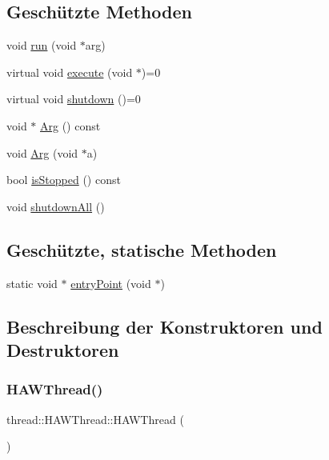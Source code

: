 \subsection*{Geschützte Methoden}
\begin{DoxyCompactItemize}
\item 
void \hyperlink{classthread_1_1_h_a_w_thread_a9a3e17be59877d350e310eb19c52679b}{run} (void $\ast$arg)
\item 
virtual void \hyperlink{classthread_1_1_h_a_w_thread_ae565cb73c096b246664bd2474b9c8907}{execute} (void $\ast$)=0
\item 
virtual void \hyperlink{classthread_1_1_h_a_w_thread_a843ee9493a41cec7e932fdec67a3b244}{shutdown} ()=0
\item 
void $\ast$ \hyperlink{classthread_1_1_h_a_w_thread_a87d9850bda803fafa714c32a63c11a89}{Arg} () const
\item 
void \hyperlink{classthread_1_1_h_a_w_thread_a368c07a801fb8f5e7bb181d2453df4be}{Arg} (void $\ast$a)
\item 
bool \hyperlink{classthread_1_1_h_a_w_thread_acd3923a840cbe1fea040fc149c4ab749}{is\+Stopped} () const
\item 
void \hyperlink{classthread_1_1_h_a_w_thread_a5124385e940aa8d52510a4be10af173c}{shutdown\+All} ()
\end{DoxyCompactItemize}
\subsection*{Geschützte, statische Methoden}
\begin{DoxyCompactItemize}
\item 
static void $\ast$ \hyperlink{classthread_1_1_h_a_w_thread_a044da2e1a8884a3e2764f9f1863863c7}{entry\+Point} (void $\ast$)
\end{DoxyCompactItemize}


\subsection{Beschreibung der Konstruktoren und Destruktoren}
\hypertarget{classthread_1_1_h_a_w_thread_a7ae3280c8aee6ae6536c736a20d92e8d}{}\label{classthread_1_1_h_a_w_thread_a7ae3280c8aee6ae6536c736a20d92e8d} 
\subsubsection{\texorpdfstring{H\+A\+W\+Thread()}{HAWThread()}}
{\footnotesize\ttfamily thread\+::\+H\+A\+W\+Thread\+::\+H\+A\+W\+Thread (\begin{DoxyParamCaption}{ }\end{DoxyParamCaption})}


